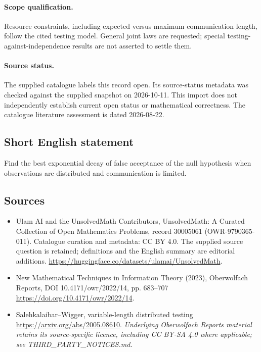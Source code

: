 \documentclass[11pt]{article}
\begin{document}
\paragraph{Scope qualification.}
Resource constraints, including expected versus maximum communication length, follow the cited testing model. General joint laws are requested; special testing-against-independence results are not asserted to settle them.
\paragraph{Source status.}
The supplied catalogue labels this record open. Its source-status metadata was checked against the supplied snapshot on 2026-10-11. This import does not independently establish current open status or mathematical correctness. The catalogue literature assessment is dated 2026-08-22.
\subsection{Short English statement}
Find the best exponential decay of false acceptance of the null hypothesis when observations are distributed and communication is limited.
\subsection{Sources}
\begin{itemize}
\item[S1] Ulam AI and the UnsolvedMath Contributors, UnsolvedMath: A Curated Collection of Open Mathematics Problems, record 30005061 (OWR-9790365-011). Catalogue curation and metadata: CC BY 4.0. The supplied source question is retained; definitions and the English summary are editorial additions.
\url{https://huggingface.co/datasets/ulamai/UnsolvedMath}.
\item[S2] New Mathematical Techniques in Information Theory (2023), Oberwolfach Reports, DOI 10.4171/owr/2022/14, pp. 683--707
\url{https://doi.org/10.4171/owr/2022/14}.
\item[S3] Salehkalaibar--Wigger, variable-length distributed testing
\url{https://arxiv.org/abs/2005.08610}.
\textit{Underlying Oberwolfach Reports material retains its source-specific licence, including CC BY-SA 4.0 where applicable; see THIRD\_PARTY\_NOTICES.md.}
\end{itemize}
\end{document}
